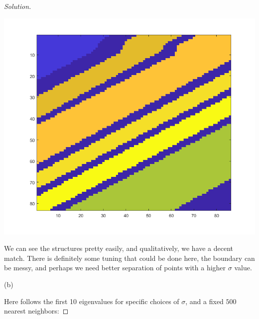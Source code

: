 \documentclass[10pt]{article}
\begin{document}
\begin{proof}[Solution]
\begin{center}
\includegraphics[width=\linewidth]{ground_truth}
\end{center}

We can see the structures pretty easily, and qualitatively, we have a decent match. There is definitely some tuning that could be done here, the boundary can be messy, and perhaps we need better separation of points with a higher $\sigma$ value.

(b)

Here follows the first 10 eigenvalues for specific choices of $\sigma$, and a fixed $500$ nearest neighbors:


\end{proof}
\end{document}

